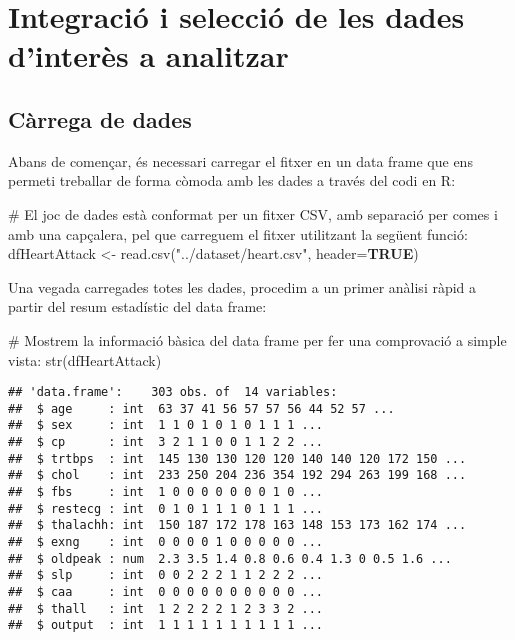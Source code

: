 \documentclass[
]{article}
\newenvironment{Shaded}{\begin{snugshade}}{\end{snugshade}}
\newcommand{\AttributeTok}[1]{\textcolor[rgb]{0.80,0.80,0.80}{#1}}
\newcommand{\CommentTok}[1]{\textcolor[rgb]{0.50,0.62,0.50}{#1}}
\newcommand{\ConstantTok}[1]{\textcolor[rgb]{0.86,0.64,0.64}{\textbf{#1}}}
\newcommand{\FunctionTok}[1]{\textcolor[rgb]{0.94,0.94,0.56}{#1}}
\newcommand{\NormalTok}[1]{\textcolor[rgb]{0.80,0.80,0.80}{#1}}
\newcommand{\OtherTok}[1]{\textcolor[rgb]{0.94,0.94,0.56}{#1}}
\newcommand{\StringTok}[1]{\textcolor[rgb]{0.80,0.58,0.58}{#1}}
\begin{document}
\hypertarget{integraciuxf3-i-selecciuxf3-de-les-dades-dinteruxe8s-a-analitzar}{%
\section{Integració i selecció de les dades d'interès a
analitzar}\label{integraciuxf3-i-selecciuxf3-de-les-dades-dinteruxe8s-a-analitzar}}

\hypertarget{cuxe0rrega-de-dades}{%
\subsection{Càrrega de dades}\label{cuxe0rrega-de-dades}}

Abans de començar, és necessari carregar el fitxer en un data frame que
ens permeti treballar de forma còmoda amb les dades a través del codi en
R:

\begin{Shaded}
\begin{Highlighting}[]
\CommentTok{\# El joc de dades està conformat per un fitxer CSV, amb separació per comes i amb una capçalera, pel que carreguem el fitxer utilitzant la següent funció:}
\NormalTok{dfHeartAttack }\OtherTok{\textless{}{-}} \FunctionTok{read.csv}\NormalTok{(}\StringTok{"../dataset/heart.csv"}\NormalTok{, }\AttributeTok{header=}\ConstantTok{TRUE}\NormalTok{)}
\end{Highlighting}
\end{Shaded}

Una vegada carregades totes les dades, procedim a un primer anàlisi
ràpid a partir del resum estadístic del data frame:

\begin{Shaded}
\begin{Highlighting}[]
\CommentTok{\# Mostrem la informació bàsica del data frame per fer una comprovació a simple vista:}
\FunctionTok{str}\NormalTok{(dfHeartAttack)}
\end{Highlighting}
\end{Shaded}

\begin{verbatim}
## 'data.frame':    303 obs. of  14 variables:
##  $ age     : int  63 37 41 56 57 57 56 44 52 57 ...
##  $ sex     : int  1 1 0 1 0 1 0 1 1 1 ...
##  $ cp      : int  3 2 1 1 0 0 1 1 2 2 ...
##  $ trtbps  : int  145 130 130 120 120 140 140 120 172 150 ...
##  $ chol    : int  233 250 204 236 354 192 294 263 199 168 ...
##  $ fbs     : int  1 0 0 0 0 0 0 0 1 0 ...
##  $ restecg : int  0 1 0 1 1 1 0 1 1 1 ...
##  $ thalachh: int  150 187 172 178 163 148 153 173 162 174 ...
##  $ exng    : int  0 0 0 0 1 0 0 0 0 0 ...
##  $ oldpeak : num  2.3 3.5 1.4 0.8 0.6 0.4 1.3 0 0.5 1.6 ...
##  $ slp     : int  0 0 2 2 2 1 1 2 2 2 ...
##  $ caa     : int  0 0 0 0 0 0 0 0 0 0 ...
##  $ thall   : int  1 2 2 2 2 1 2 3 3 2 ...
##  $ output  : int  1 1 1 1 1 1 1 1 1 1 ...
\end{verbatim}
\end{document}
